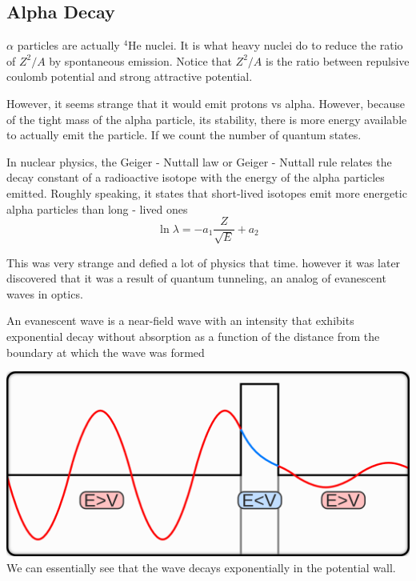 \documentclass[english, 11pt]{article}
\begin{document}
\subsection{Alpha Decay}

$\alpha$ particles are actually $^4$He nuclei. It is what heavy nuclei do to reduce the ratio of $Z^2/A$ by spontaneous emission. Notice that $Z^2/A$ is the ratio between repulsive coulomb potential and strong attractive potential.

However, it seems strange that it would emit protons vs alpha. However, because of the tight mass of the alpha particle, its stability, there is more energy available to actually emit the particle. If we count the number of quantum states.

\begin{defn}
   In nuclear physics, the Geiger - Nuttall law or Geiger - Nuttall rule relates the decay constant of a radioactive isotope with the energy of the alpha particles emitted. Roughly speaking, it states that short-lived isotopes emit more energetic alpha particles than long - lived ones
   \[\ln \lambda = -a_1\frac{Z}{\sqrt{E}}+a_2\]
\end{defn}

This was very strange and defied a lot of physics that time. however it was later discovered that it was a result of quantum tunneling, an analog of evanescent waves in optics.

\begin{defn}
  An evanescent wave is a near-field wave with an intensity that exhibits exponential decay without absorption as a function of the distance from the boundary at which the wave was formed
\end{defn}

\begin{center}
 \includegraphics[scale=0.7]{../img/qwave}\\
 We can essentially see that the wave decays exponentially in the potential wall.
\end{center}
\end{document}
